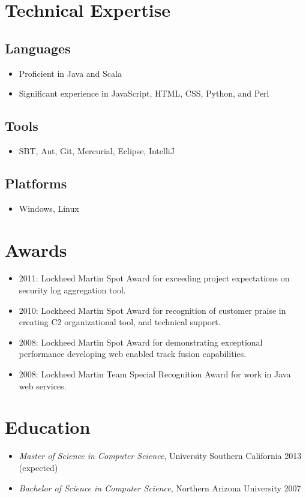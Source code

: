 \documentclass[11pt]{article}
\begin{document}
\section*{Technical Expertise}
\label{sec-2}

\subsection*{Languages}
\label{sec-2.1}

\begin{itemize}
\item Proficient in Java and Scala
\item Significant experience in JavaScript, HTML, CSS, Python, and Perl
\end{itemize}
\subsection*{Tools}
\label{sec-2.2}

\begin{itemize}
\item SBT, Ant, Git, Mercurial, Eclipse, IntelliJ
\end{itemize}
\subsection*{Platforms}
\label{sec-2.3}

\begin{itemize}
\item Windows, Linux
\end{itemize}
\section*{Awards}
\label{sec-3}

\begin{itemize}
\item 2011: Lockheed Martin Spot Award for exceeding project expectations on security log aggregation tool.
\item 2010: Lockheed Martin Spot Award for recognition of customer praise in creating C2 organizational tool, and technical support.
\item 2008: Lockheed Martin Spot Award for demonstrating exceptional performance developing web enabled track fusion capabilities.
\item 2008: Lockheed Martin Team Special Recognition Award for work in Java web services.
\end{itemize}
\section*{Education}
\label{sec-4}

\begin{itemize}
\item \emph{Master of Science in Computer Science}, University Southern California 2013 (expected)
\item \emph{Bachelor of Science in Computer Science}, Northern Arizona University 2007
\end{itemize}
\end{document}
